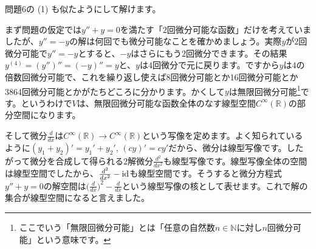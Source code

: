 問題6の (1) も似たようにして解けます。

まず問題の仮定では$y'' + y= 0$を満たす「$2$回微分可能な函数」だけを考えていましたが、$y'' = -y$の解は何回でも微分可能なことを確かめましょう。実際$y$が$2$回微分可能で$y'' = -y$とすると、$-y$はさらにもう$2$回微分できます。その結果$y^{(4)} = (y'')'' = (-y)'' = y$と、$y$は$4$回微分で元に戻ります。ですから$y$は$4$の倍数回微分可能で、これを繰り返し使えば8回微分可能とか16回微分可能とか3864回微分可能とかがたちどころに分かります。かくして$y$は無限回微分可能\footnote{ここでいう「無限回微分可能」とは「任意の自然数$n\in\mathbb{N}$に対し$n$回微分可能」という意味です。}です。というわけで$V$は、無限回微分可能な函数全体のなす線型空間$C^{\infty}(\mathbb{R})$の部分空間になります。

そして微分$\frac{d}{dx}$は$C^{\infty}(\mathbb{R}) \rightarrow C^{\infty}(\mathbb{R})$という写像を定めます。よく知られているように$(y_1 + y_2)' = y_1' + y_2'$, $(cy)' = cy'$だから、微分は線型写像です。したがって微分を合成して得られる$2$解微分$\frac{d^2}{dx^2}$も線型写像です。線型写像全体の空間は線型空間でしたから、$\frac{d^2}{dx^2}-\operatorname{id}$も線型空間です。そうすると微分方程式$y'' + y = 0$の解空間は$\bigl(\frac{d}{dx}\bigr)^2 - \frac{d}{dx}$という線型写像の核として表せます。これで解の集合が線型空間になると言えました。

